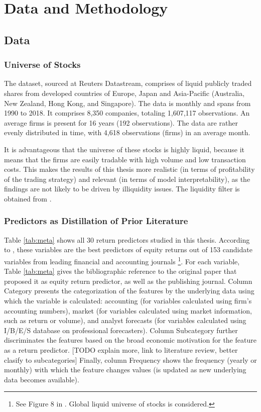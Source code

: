 \chapter{Data and Methodology}
\label{chap:met}

\section{Data}

	\subsection{Universe of Stocks}
		The dataset, sourced at Reuters Datastream, comprises of liquid publicly traded shares from developed countries of Europe, Japan and Asia-Pacific (Australia, New Zealand, Hong Kong, and Singapore). The data is monthly and spans from 1990 to 2018. It comprises 8,350 companies, totaling 1,607,117 observations. An average firms is present for 16 years (192 observations). The data are rather evenly distributed in time, with 4,618 observations (firms) in an average month. 
		
		It is advantageous that the universe of these stocks is highly liquid, because it means that the firms are easily tradable with high volume and low transaction costs. This makes the results of this thesis more realistic (in terms of profitability of the trading strategy) and relevant (in terms of model interpretability), as the findings are not likely to be driven by illiquidity issues. The liquidity filter is obtained from \cite{tobek2020does}.  
	
	\subsection{Predictors as Distillation of Prior Literature}
		Table \ref{tab:meta} shows all 30 return predictors studied in this thesis. According to \cite{tobek2020does}, these variables are the best predictors of equity returns out of 153  candidate variables from leading financial and accounting journals \footnote{See Figure 8 in \cite{tobek2020does}. Global liquid universe of stocks is considered.}. For each variable, Table \ref{tab:meta} gives the bibliographic reference to the original paper that proposed it as equity return predictor, as well as the publishing journal. Column Category presents the categorization of the features by the underlying data using which the variable is calculated: accounting (for variables calculated using firm's accounting numbers), market (for variables calculated using market information, such as return or volume), and analyst forecasts (for variables calculated using I/B/E/S database on professional forecasters). Column Subcategory further discriminates the features based on the broad economic motivation for the feature as a return predictor. [TODO explain more, link to literature review, better clasify to subcategories] Finally, column Frequency shows the frequency (yearly or monthly) with which the feature changes values (is updated as new underlying data becomes available).
		

